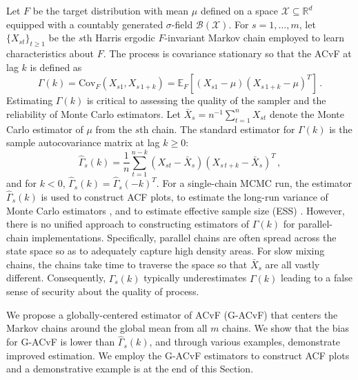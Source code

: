 \documentclass[11pt]{article}
\newcommand{\Cov}{\text{Cov}}
\newcommand{\X}{\mathcal{X}}
\theoremstyle{remark}
\begin{document}
Let $F$ be the target distribution with mean $\mu$ defined on a space $\X \subseteq \mathbb{R}^d$ equipped with a countably generated $\sigma$-field $\mathcal{B}(\X)$. For $s = 1, \dots, m$, let $\{X_{st}\}_{t\geq1}$ be the $s${th} Harris ergodic $F$-invariant Markov chain \citep[see][for definitions]{meyn:twee:2009} employed to learn characteristics about $F$. The process is covariance stationary so that
the ACvF at lag $k$ is defined as 
%
\[
    \Gamma(k) = \Cov_F(X_{s1}, X_{s\,1+k})= \mathbb{E}_F \left[(X_{s1} - \mu)(X_{s\,1+k} - \mu)^T \right]\,.
\]
Estimating $\Gamma(k)$ is critical to assessing the quality of the sampler and the reliability of Monte Carlo estimators. Let $\bar{X}_s = n^{-1} \sum_{t=1}^{n} X_{st}$ denote the Monte Carlo estimator of $\mu$ from the $s$th chain. The standard estimator for $\Gamma(k)$ is the sample autocovariance matrix at lag $k \geq 0$:
%
\begin{equation} \label{eq:empirical_ACvF}
    \hat{\Gamma}_s(k) = \dfrac{1}{n}\sum_{t=1}^{n-k} \left(X_{st} - \bar{X}_s \right) \left(X_{s\, t + k} - \bar{X}_s \right)^T\,,
\end{equation}
and for $k < 0$, $\hat{\Gamma}_s(k) = \hat{\Gamma}_s(-k)^T$. For a single-chain MCMC run, the estimator $\hat{\Gamma}_s(k)$ is used to construct ACF plots, to estimate the long-run variance of Monte Carlo estimators \citep{hannan:1970,dame:1991}, and to estimate effective sample size (ESS) \citep{kass:carlin:gelman:neal:1998,gong:fleg:2016,vats:fleg:jon:2019}. However, there is no unified approach to constructing estimators of $\Gamma(k)$ for parallel-chain implementations. Specifically, parallel chains are often spread across the state space so as to adequately capture high density areas. For slow mixing chains, the chains take time to traverse the space so that $\bar{X}_s$  are all vastly different. Consequently, $\hat{\Gamma}_s(k)$ typically underestimates $\Gamma(k)$ leading to a false sense of security about the quality of process.


 We propose a globally-centered estimator of ACvF (G-ACvF) that centers the Markov chains around the global mean from all $m$ chains. We show that the bias for G-ACvF is lower than $\hat{\Gamma}_s(k)$, and through various examples, demonstrate improved estimation. We employ the G-ACvF estimators to construct ACF plots and a demonstrative example is at the end of this Section. 


 
\end{document}
